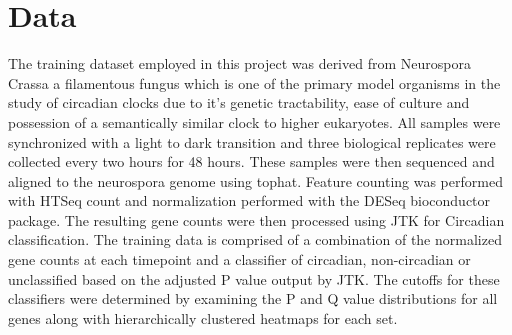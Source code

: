 \documentclass[prl,amsmath,amssymb,floatfix,superscriptaddress,notitlepage,twocolumn]{revtex4}
\begin{document}
\section{Data}
The training dataset employed in this project was derived from Neurospora Crassa a filamentous fungus which is one of the primary model organisms in the study of circadian clocks due to it's genetic tractability, ease of culture and possession of a semantically similar clock to higher eukaryotes.  All samples were synchronized with a light to dark transition and three biological replicates were collected every two hours for 48 hours.  These samples were then sequenced and aligned to the neurospora genome using tophat.  Feature counting was performed with HTSeq count and normalization performed with the DESeq bioconductor package.  The resulting gene counts were then processed using JTK for Circadian classification.  The training data is comprised of a combination of the normalized gene counts at each timepoint and a classifier of circadian, non-circadian or unclassified based on the adjusted P value output by JTK. The cutoffs for these classifiers were determined by examining the P and Q value distributions for all genes along with hierarchically clustered heatmaps for each set.
\end{document}
